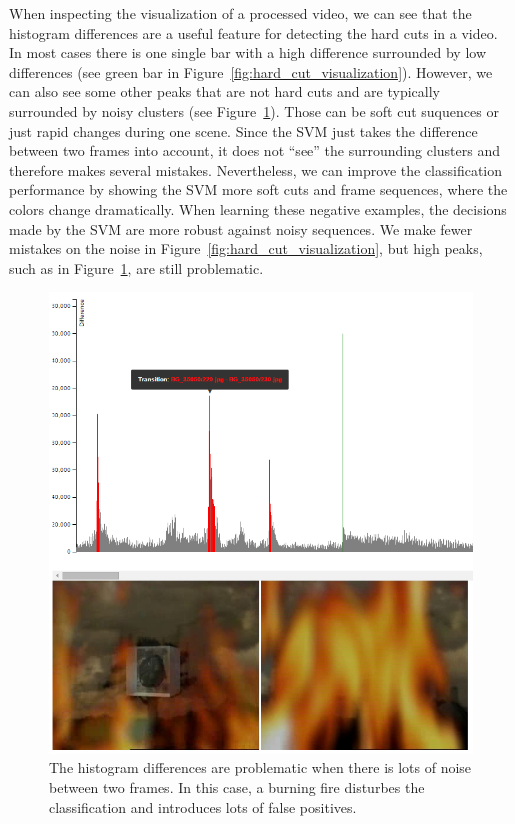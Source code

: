 When inspecting the visualization of a processed video, we can see that the histogram differences are a useful feature for detecting the hard cuts in a video.
In most cases there is one single bar with a high difference surrounded by low differences (see green bar in Figure~\ref{fig:hard_cut_visualization}).
However, we can also see some other peaks that are not hard cuts and are typically surrounded by noisy clusters (see Figure~\ref{fig:hard_cut_noise_visualization}).
Those can be soft cut suquences or just rapid changes during one scene.
Since the SVM just takes the difference between two frames into account, it does not ``see'' the surrounding clusters and therefore makes several mistakes.
Nevertheless, we can improve the classification performance by showing the SVM more soft cuts and frame sequences, where the colors change dramatically.
When learning these negative examples, the decisions made by the SVM are more robust against noisy sequences.
We make fewer mistakes on the noise in Figure~\ref{fig:hard_cut_visualization}, but high peaks, such as in Figure~\ref{fig:hard_cut_noise_visualization}, are still problematic.

\begin{figure}
	\centering
	\includegraphics[scale=.7]{images/hard_cut_noise_visualization.png}
	\caption{The histogram differences are problematic when there is lots of noise between two frames. In this case, a burning fire disturbes the classification and introduces lots of false positives.}
	\label{fig:hard_cut_noise_visualization}
\end{figure}
